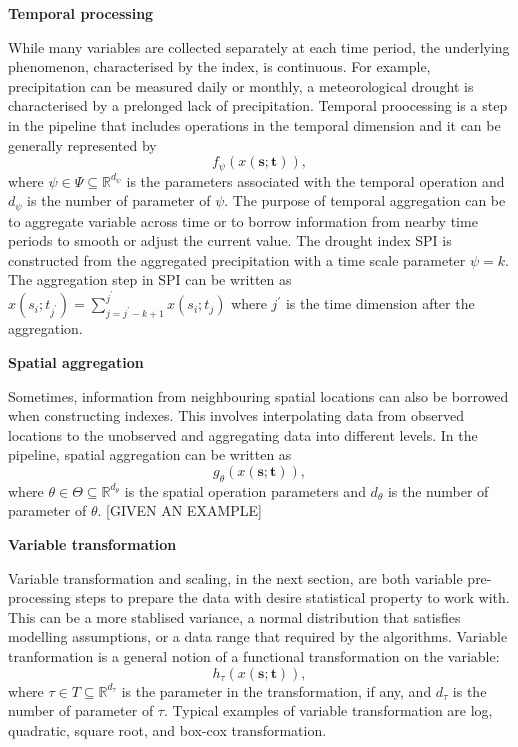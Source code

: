 \documentclass[
]{article}
\begin{document}
\textbf{Temporal processing}

While many variables are collected separately at each time period, the
underlying phenomenon, characterised by the index, is continuous. For
example, precipitation can be measured daily or monthly, a
meteorological drought is characterised by a prelonged lack of
precipitation. Temporal proocessing is a step in the pipeline that
includes operations in the temporal dimension and it can be generally
represented by \[f_{\mathcal{\psi}}(x(\mathbf{s};\mathbf{t})),\] where
\(\psi \in \Psi \subseteq \mathbb{R}^{d_{\psi}}\) is the parameters
associated with the temporal operation and \(d_{\psi}\) is the number of
parameter of \(\psi\). The purpose of temporal aggregation can be to
aggregate variable across time or to borrow information from nearby time
periods to smooth or adjust the current value. The drought index SPI is
constructed from the aggregated precipitation with a time scale
parameter \(\psi = k\). The aggregation step in SPI can be written as
\(x(s_i;t_{j^\prime}) = \sum_{j = j^\prime-k+1}^{j^\prime}x(s_i; t_j)\)
where \(j^\prime\) is the time dimension after the aggregation.

\textbf{Spatial aggregation}

Sometimes, information from neighbouring spatial locations can also be
borrowed when constructing indexes. This involves interpolating data
from observed locations to the unobserved and aggregating data into
different levels. In the pipeline, spatial aggregation can be written as
\[g_{\mathcal{\theta}}(x(\mathbf{s};\mathbf{t})),\] where
\(\theta \in \Theta \subseteq \mathbb{R}^{d_{\theta}}\) is the spatial
operation parameters and \(d_{\theta}\) is the number of parameter of
\(\theta\). {[}GIVEN AN EXAMPLE{]}

\newpage

\textbf{Variable transformation }

Variable transformation and scaling, in the next section, are both
variable pre-processing steps to prepare the data with desire
statistical property to work with. This can be a more stablised
variance, a normal distribution that satisfies modelling assumptions, or
a data range that required by the algorithms. Variable tranformation is
a general notion of a functional transformation on the variable:
\[h_{\tau}(x(\mathbf{s};\mathbf{t})),\] where
\(\tau \in T \subseteq \mathbb{R}^{d_{\tau}}\) is the parameter in the
transformation, if any, and \(d_{\tau}\) is the number of parameter of
\(\tau\). Typical examples of variable transformation are log,
quadratic, square root, and box-cox transformation.
\end{document}
